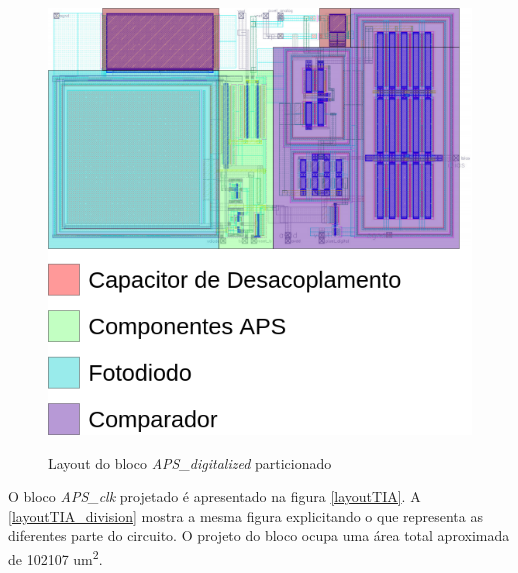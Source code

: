 \begin{figure}[!h]
 \centering
    \centering
    \caption{Layout do bloco \textit{APS\_digitalized} particionado} 
    \includegraphics[scale=0.3]{Projeto/Layout/Imagens/Image_APS_Digitalized.png}
    \label{layoutAPSDIG_division}
\end{figure}

O bloco \textit{APS\_clk} projetado é apresentado na figura \autoref{layoutTIA}. A \autoref{layoutTIA_division} mostra a mesma figura explicitando o que representa as diferentes parte do circuito. O projeto do bloco ocupa uma área total aproximada de 102107 um\textsuperscript{2}.

